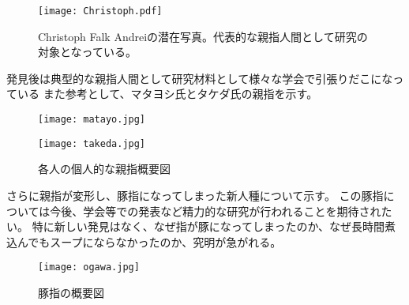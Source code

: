 \begin{figure}
\centering
\texttt{[image: Christoph.pdf]}
\caption{Christoph Falk Andreiの潜在写真。代表的な親指人間として研究の対象となっている。}
\label{oyayubi}
\end{figure}

発見後は典型的な親指人間として研究材料として様々な学会で引張りだこになっている
また参考として、マタヨシ氏とタケダ氏の親指を示す。
\begin{figure}[htbp]
    \centering
  \begin{minipage}{0.4\linewidth}
    \centering
    \texttt{[image: matayo.jpg]}
  \end{minipage}
  \begin{minipage}{0.4\linewidth}
    \centering
    \texttt{[image: takeda.jpg]}
  \end{minipage}
  \caption{各人の個人的な親指概要図}
 \end{figure}

さらに親指が変形し、豚指になってしまった新人種について示す。
この豚指については今後、学会等での発表など精力的な研究が行われることを期待されたい。
特に新しい発見はなく、なぜ指が豚になってしまったのか、なぜ長時間煮込んでもスープにならなかったのか、究明が急がれる。
\begin{figure}
\centering
\texttt{[image: ogawa.jpg]}
\caption{豚指の概要図}
\end{figure}

\newpage
\clearpage
